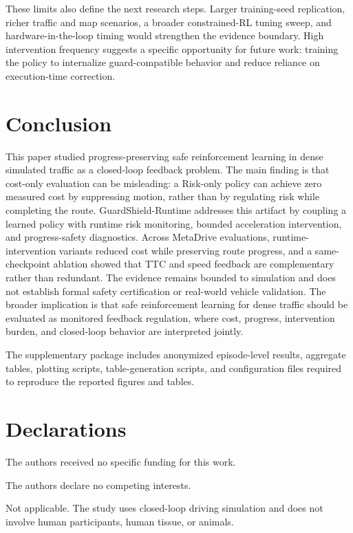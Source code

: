 \documentclass[pdflatex,sn-mathphys-ay]{sn-jnl}
\begin{document}
These limits also define the next research steps. Larger training-seed replication, richer traffic and map scenarios, a broader constrained-RL tuning sweep, and hardware-in-the-loop timing would strengthen the evidence boundary. High intervention frequency suggests a specific opportunity for future work: training the policy to internalize guard-compatible behavior and reduce reliance on execution-time correction.

\section{Conclusion}\label{sec_conclusion}

This paper studied progress-preserving safe reinforcement learning in dense simulated traffic as a closed-loop feedback problem. The main finding is that cost-only evaluation can be misleading: a Risk-only policy can achieve zero measured cost by suppressing motion, rather than by regulating risk while completing the route. GuardShield-Runtime addresses this artifact by coupling a learned policy with runtime risk monitoring, bounded acceleration intervention, and progress-safety diagnostics. Across MetaDrive evaluations, runtime-intervention variants reduced cost while preserving route progress, and a same-checkpoint ablation showed that TTC and speed feedback are complementary rather than redundant. The evidence remains bounded to simulation and does not establish formal safety certification or real-world vehicle validation. The broader implication is that safe reinforcement learning for dense traffic should be evaluated as monitored feedback regulation, where cost, progress, intervention burden, and closed-loop behavior are interpreted jointly.

\backmatter

The supplementary package includes anonymized episode-level results, aggregate tables, plotting scripts, table-generation scripts, and configuration files required to reproduce the reported figures and tables.

\section*{Declarations}

The authors received no specific funding for this work.

The authors declare no competing interests.

Not applicable. The study uses closed-loop driving simulation and does not involve human participants, human tissue, or animals.
\end{document}
